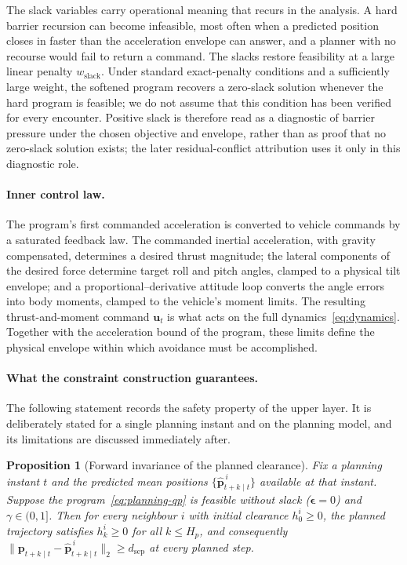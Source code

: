 \documentclass[11pt]{article}
\theoremstyle{plain}
\newtheorem{proposition}{Proposition}
\theoremstyle{definition}
\newcommand{\bu}{\bm{u}}
\begin{document}
The slack variables carry operational meaning that recurs in the
analysis. A hard barrier recursion can become infeasible, most often
when a predicted position closes in faster than the acceleration
envelope can answer, and a planner with no recourse would fail to
return a command. The slacks restore feasibility at a large linear penalty
$w_{\mathrm{slack}}$. Under standard exact-penalty conditions and a
sufficiently large weight, the softened program recovers a zero-slack
solution whenever the hard program is feasible; we do not assume that
this condition has been verified for every encounter. Positive slack is therefore read as a diagnostic of barrier pressure
under the chosen objective and envelope, rather than as proof that no
zero-slack solution exists; the later residual-conflict attribution
uses it only in this diagnostic role.
 
\paragraph{Inner control law.}
The program's first commanded acceleration is converted to vehicle
commands by a saturated feedback law. The commanded inertial
acceleration, with gravity compensated, determines a desired thrust
magnitude; the lateral components of the desired force determine
target roll and pitch angles, clamped to a physical tilt envelope; and
a proportional--derivative attitude loop converts the angle errors
into body moments, clamped to the vehicle's moment limits. The
resulting thrust-and-moment command $\bu_t$ is what acts on the full
dynamics~\eqref{eq:dynamics}. Together with the acceleration bound of the program, these limits
define the physical envelope within which avoidance must be
accomplished.
 
\paragraph{What the constraint construction guarantees.}
The following statement records the safety property of the upper
layer. It is deliberately stated for a single planning instant and on
the planning model, and its limitations are discussed immediately
after.
 
\begin{proposition}[Forward invariance of the planned clearance]
	\label{prop:forward-invariance}
	Fix a planning instant $t$ and the predicted mean positions
	$\{\hat{\bm{p}}^{\,i}_{t+k \mid t}\}$ available at that instant.
	Suppose the program~\eqref{eq:planning-qp} is feasible without
	slack ($\bm{\epsilon} = 0$) and $\gamma \in (0, 1]$. Then for every
	neighbour $i$ with initial clearance $h^i_0 \geq 0$, the planned
	trajectory satisfies $h^i_k \geq 0$ for all $k \leq H_p$, and
	consequently
	$\| \bm{p}_{t+k \mid t} - \hat{\bm{p}}^{\,i}_{t+k \mid t} \|_2
		\geq d_{\mathrm{sep}}$ at every planned step.
\end{proposition}
 
\end{document}
